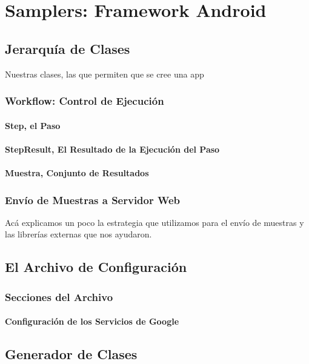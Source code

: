 \chapter{Samplers: Framework Android}

\section{Jerarquía de Clases}
Nuestras clases, las que permiten que se cree una app

\subsection{Workflow: Control de Ejecución}

\subsubsection{Step, el Paso}

\subsubsection{StepResult, El Resultado de la Ejecución del Paso}

\subsubsection{Muestra, Conjunto de Resultados}

\subsection{Envío de Muestras a Servidor Web}
Acá explicamos un poco la estrategia que utilizamos para el envío de muestras y las librerías externas que nos ayudaron.

\section{El Archivo de Configuración}

\subsection{Secciones del Archivo}

\subsubsection{Configuración de los Servicios de Google}

\section{Generador de Clases}
